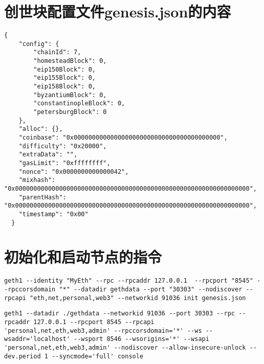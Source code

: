 %
%
%
%
%
%

\begin{appendices}
  \section{创世块配置文件genesis.json的内容}

  \begin{lstlisting}[caption={genesis.json的内容}]
  {
    "config": {
        "chainId": 7,
        "homesteadBlock": 0,
        "eip150Block": 0,
        "eip155Block": 0,
        "eip158Block": 0,
        "byzantiumBlock": 0,
        "constantinopleBlock": 0,
        "petersburgBlock": 0
    },
    "alloc": {},
    "coinbase": "0x0000000000000000000000000000000000000000",
    "difficulty": "0x20000",
    "extraData": "",
    "gasLimit": "0xffffffff",
    "nonce": "0x0000000000000042",
    "mixhash": "0x0000000000000000000000000000000000000000000000000000000000000000",
    "parentHash": "0x0000000000000000000000000000000000000000000000000000000000000000",
    "timestamp": "0x00"
  }
  \end{lstlisting}

  \section{初始化和启动节点的指令}

  \begin{lstlisting}[caption={初始化节点的指令}]
  geth1 --identity "MyEth" --rpc --rpcaddr 127.0.0.1  --rpcport "8545" --rpccorsdomain "*" --datadir gethdata --port "30303" --nodiscover --rpcapi "eth,net,personal,web3" --networkid 91036 init genesis.json
  \end{lstlisting}

  \begin{lstlisting}[caption={启动节点的指令}]
  geth1 --datadir ./gethdata --networkid 91036 --port 30303 --rpc --rpcaddr 127.0.0.1 --rpcport 8545 --rpcapi 'personal,net,eth,web3,admin' --rpccorsdomain='*' --ws --wsaddr='localhost' --wsport 8546 --wsorigins='*' --wsapi 'personal,net,eth,web3,admin' --nodiscover --allow-insecure-unlock --dev.period 1 --syncmode='full' console
  \end{lstlisting}
\end{appendices}

